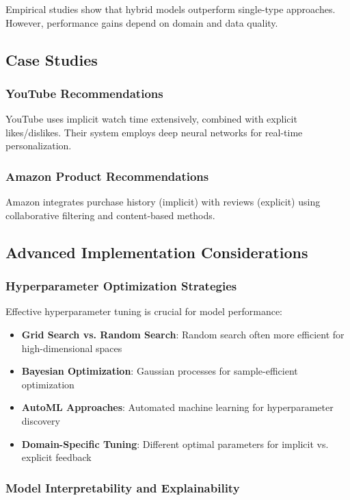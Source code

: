 Empirical studies show that hybrid models outperform single-type approaches. However, performance gains depend on domain and data quality.

\subsection{Case Studies}

\subsubsection{YouTube Recommendations}

YouTube uses implicit watch time extensively, combined with explicit likes/dislikes. Their system employs deep neural networks for real-time personalization.

\subsubsection{Amazon Product Recommendations}

Amazon integrates purchase history (implicit) with reviews (explicit) using collaborative filtering and content-based methods.

\subsection{Advanced Implementation Considerations}

\subsubsection{Hyperparameter Optimization Strategies}

Effective hyperparameter tuning is crucial for model performance:

\begin{itemize}
    \item \textbf{Grid Search vs. Random Search}: Random search often more efficient for high-dimensional spaces
    \item \textbf{Bayesian Optimization}: Gaussian processes for sample-efficient optimization
    \item \textbf{AutoML Approaches}: Automated machine learning for hyperparameter discovery
    \item \textbf{Domain-Specific Tuning}: Different optimal parameters for implicit vs. explicit feedback
\end{itemize}

\subsubsection{Model Interpretability and Explainability}

